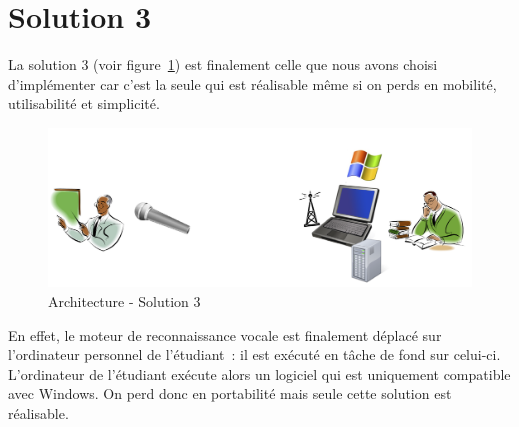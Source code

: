 \section{Solution 3}
La solution 3 (voir figure~\ref{fig:solution3}) est finalement celle que nous avons choisi d'implémenter car c'est la seule qui est réalisable même si on perds en mobilité, utilisabilité et simplicité.


\begin{figure}[h]
 \centering
 \includegraphics[scale=0.5]{./images/solution3.png}
 \caption{Architecture - Solution 3}
 \label{fig:solution3}
\end{figure}


En effet, le moteur de reconnaissance vocale est finalement déplacé sur l'ordinateur personnel de l'étudiant~: il est exécuté en tâche de fond sur celui-ci. L'ordinateur de l'étudiant exécute alors un logiciel qui est uniquement compatible avec Windows. On perd donc en portabilité mais seule cette solution est réalisable.

